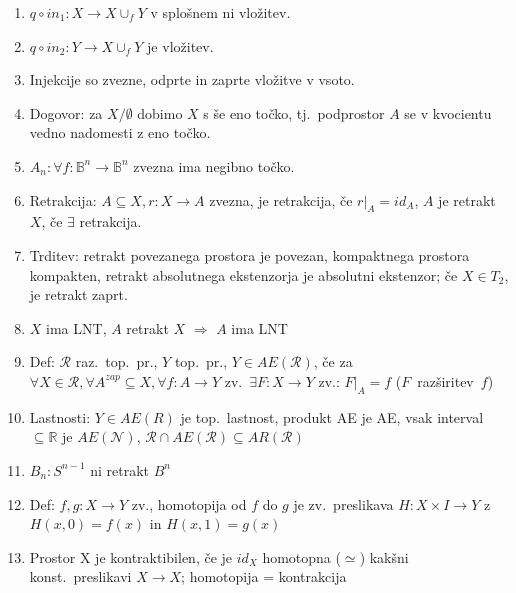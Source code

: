 \documentclass[10pt,a4paper]{article}
\begin{document}
\begin{enumerate}
\item $q \circ in_1: X \rightarrow X \cup_f Y$ v splošnem ni vložitev.
    
\item $q \circ in_2: Y \rightarrow X \cup_f Y$ je vložitev.
    
\item Injekcije so zvezne, odprte in zaprte vložitve v vsoto.
    
\item Dogovor: za $X / \emptyset$ dobimo $X$ s še eno točko, tj.~podprostor $A$
    se v kvocientu vedno nadomesti z eno točko.
    
\item $A_n:\forall f : \mathbb{B}^n \rightarrow \mathbb{B}^n$ zvezna ima negibno točko.
    
\item Retrakcija: $A \subseteq X, r: X \rightarrow A$ zvezna, je retrakcija, če $r|_A = id_A$, $A$ je retrakt $X$, če $\exists$ retrakcija.
    
\item Trditev: retrakt povezanega prostora je povezan, kompaktnega prostora kompakten, retrakt absolutnega ekstenzorja je absolutni ekstenzor; če $X \in T_2$, je retrakt zaprt.
    
\item $X$ ima LNT, $A$ retrakt $X$ $\Rightarrow$ $A$ ima LNT
    
\item Def: $\mathcal{R}$ raz.~top.~pr., $Y$ top.~pr., $Y \in AE(\mathcal{R})$, če za $\forall X \in \mathcal{R}, \forall A^{zap} \subseteq X, \forall f: A \rightarrow Y$ zv.\ $\exists F: X \rightarrow Y$ zv.: $F|_A = f$ ($F$~razširitev~$f$)
    
\item Lastnosti: $Y \in AE(R)$ je top.~lastnost, produkt AE je AE, vsak interval $\subseteq \mathbb{R}$ je $AE(\mathcal{N})$, $\mathcal{R} \cap AE(\mathcal{R}) \subseteq AR(\mathcal{R})$
    
\item $B_n: S^{n-1}$ ni retrakt $B^n$
    
\item Def: $f,g: X \rightarrow Y$ zv., homotopija od $f$ do $g$ je zv.~preslikava $H: X \times I \rightarrow Y$ z $H(x, 0) = f(x)$ in $H(x, 1) = g(x)$
    
\item Prostor X je kontraktibilen, če je $id_X$ homotopna ($\simeq$) kakšni konst.~preslikavi $X \rightarrow X$; homotopija = kontrakcija
    

\end{enumerate}
\end{document}
